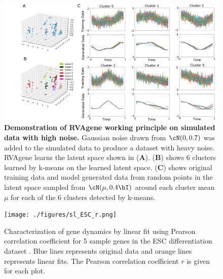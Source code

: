 \begin{center}
\begin{figure}[H]
  \includegraphics[width=\linewidth]{./figures/noisy_sim.png}
    \caption[Demonstration of RVAgene working principle on simulated data with high noise.]{\textbf{Demonstration of RVAgene working principle on simulated data with high noise.} Gaussian noise drawn from $\cN(0,0.7)$ was added to the simulated data to produce a dataset with heavy noise. RVAgene learns the latent space shown in ({\bf A}). ({\bf B}) shows 6 clusters learned by k-means on the learned latent space. ({\bf C}) shows original training data and model generated data from random points in the latent space sampled from $\cN(\mu,0.4\bI)$ around each cluster mean $\mu$ for each of the 6 clusters detected by k-means.}
  \label{fig:figS1}
\end{figure}
\end{center}
\newpage

\begin{center}
\begin{figure}[H]
  \texttt{[image: ./figures/sl\_ESC\_r.png]}
    \caption[Characterization of gene dynamics by linear fit using Pearson correlation coefficient for 5 sample genes in the ESC differentiation dataset]{Characterization of gene dynamics by linear fit using Pearson correlation coefficient for 5 sample genes in the ESC differentiation dataset  \citep{Klein2015}. Blue lines represents original data and orange lines represents linear fits. The Pearson correlation coefficient $r$ is given for each plot.}
  \label{fig:figS2}
\end{figure}
\end{center}
\newpage

